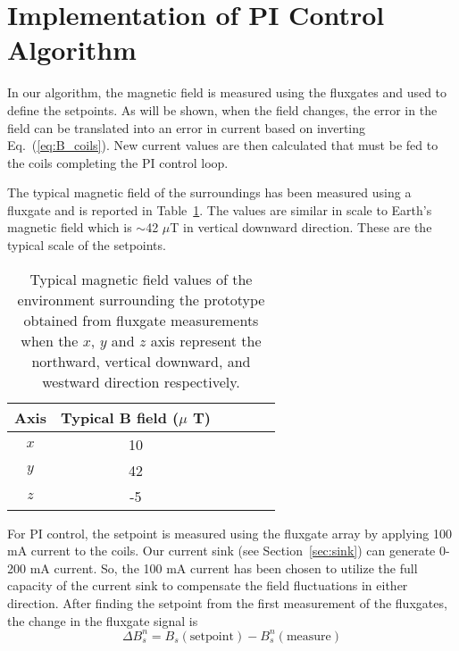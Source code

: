 \section{Implementation of PI Control Algorithm}\label{sec:pi}
 In our algorithm, the magnetic field is measured using the fluxgates and used to define the setpoints. As will be shown, when the field changes, the error in the field can be translated into an error in current based on inverting Eq.~(\ref{eq:B_coils}). New current values are then calculated that must be fed to the coils completing the PI control loop. 


The typical magnetic field of the surroundings has been measured using a fluxgate and is reported in Table~\ref{table:Benvironment}. The values are similar in scale to Earth's magnetic field which is $\sim$42 $\mu$T in vertical downward direction. These are the typical scale of the setpoints.

\begin{table} 
    \centering
    \begin{tabular} { |c|c|c|c|c|c|} 
        \hline
        Axis & \makecell{Typical B field \\($\mu$ T)}\\
        \hline\hline
        $x$ & 10 \\ 
        \hline
        $y$ & 42 \\ 
        \hline
        $z$ & -5 \\ 
        \hline
    \end{tabular}
    \caption[Typical magnetic fields surrounding the prototype]{Typical magnetic field values of the environment surrounding the prototype obtained from fluxgate measurements when the $x$, $y$ and $z$ axis represent the northward, vertical downward, and westward direction respectively. }\label{table:Benvironment}
\end{table}

For PI control, the setpoint is measured using the fluxgate array by applying 100 mA current to the coils. Our current sink (see Section~\ref{sec:sink}) can generate 0-200 mA current. So, the 100 mA current has been chosen to utilize the full capacity of the current sink to compensate the field fluctuations in either direction. After finding the setpoint from the first measurement of the fluxgates, the change in the fluxgate signal is
\begin{equation}\label{eq:del_B}
    \Delta B_s^n = B_s(\mathrm{setpoint}) - B_s^n(\mathrm{measure})
\end{equation}

